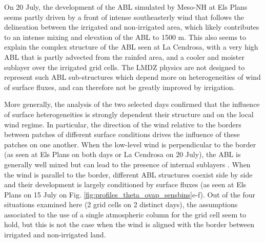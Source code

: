 On 20 July, the development of the ABL simulated by Meso-NH at Els Plans seems partly driven by a front of intense southeasterly wind that follows the delineation between the irrigated and non-irrigated area, which likely contributes to an intense mixing and elevation of the ABL to 1500 m. 
This also seems to explain the complex structure of the ABL seen at La Cendrosa, with a very high ABL that is partly advected from the rainfed area, and a cooler and moister sublayer over the irrigated grid cells. 
The LMDZ physics are not designed to represent such ABL sub-structures which depend more on heterogeneities of wind of surface fluxes, and can therefore not be greatly improved by irrigation.

More generally, the analysis of the two selected days confirmed that the influence of surface heterogeneities is strongly dependent their structure and on the local wind regime. 
In particular, the direction of the wind relative to the borders between patches of different surface conditions drives the influence of these patches on one another.
When the low-level wind is perpendicular to the border (as seen at Els Plans on both days or La Cendrosa on 20 July), the ABL is generally well mixed but can lead to the presence of internal sublayers \citep[as reviewed in][]{bou-zeid_persistent_2020}. When the wind is parallel to the border, different ABL structures coexist side by side and their development is largely conditioned by surface fluxes (as seen at Els Plans on 15 July on Fig. \ref{fig:profiles_theta_ovap_sensbins}e-f).
Out of the four situations examined here (2 grid cells on 2 distinct days), the assumptions associated to the use of a single atmospheric column for the grid cell seem to hold, but this is not the case when the wind is aligned with the border between irrigated and non-irrigated land.

\clearpage


